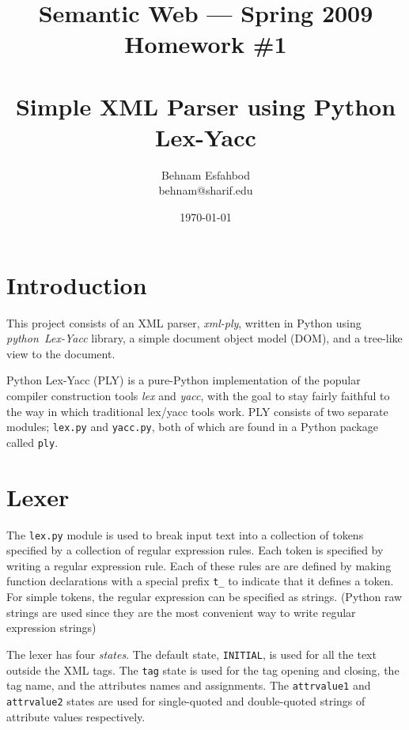 \documentclass{article}
\begin{document}
\title{%
  Semantic Web --- Spring 2009\\%
  Homework \#1\\%
  ~\\%
  \huge{Simple XML Parser using Python Lex-Yacc}%
}

\author{
  Behnam Esfahbod\\%
  behnam@sharif.edu%
}

\date{\today}

\maketitle



\section{Introduction}

This project consists of an XML parser, \emph{xml-ply}, written in Python
using \emph{python~Lex-Yacc} library, a simple document object model (DOM),
and a tree-like view to the document.

Python Lex-Yacc (PLY) \cite{PLY} is a pure-Python implementation of the
popular compiler construction tools \emph{lex} and \emph{yacc}, with the goal
to stay fairly faithful to the way in which traditional lex/yacc tools work.
PLY consists of two separate modules; {\tt lex.py} and {\tt yacc.py}, both of
which are found in a Python package called {\tt ply}.


\section{Lexer}

The {\tt lex.py} module is used to break input text into a collection of
tokens specified by a collection of regular expression rules. Each token is
specified by writing a regular expression rule. Each of these rules are are
defined by making function declarations with a special prefix {\tt t\_} to
indicate that it defines a token. For simple tokens, the regular expression
can be specified as strings. (Python raw strings are used since they are the
most convenient way to write regular expression strings)

The lexer has four \emph{states}. The default state, {\tt INITIAL}, is used
for all the text outside the XML tags.  The {\tt tag} state is used for the
tag opening and closing, the tag name, and the attributes names and
assignments. The {\tt attrvalue1} and {\tt attrvalue2} states are used for
single-quoted and double-quoted strings of attribute values respectively.
\end{document}
